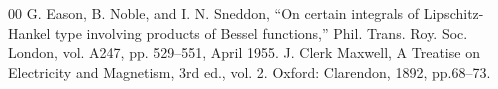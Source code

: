 \documentclass[conference]{IEEEtran}
\begin{document}


\begin{thebibliography}{00}
 G. Eason, B. Noble, and I. N. Sneddon, ``On certain integrals of Lipschitz-Hankel type involving products of Bessel functions,'' Phil. Trans. Roy. Soc. London, vol. A247, pp. 529--551, April 1955.
 J. Clerk Maxwell, A Treatise on Electricity and Magnetism, 3rd ed., vol. 2. Oxford: Clarendon, 1892, pp.68--73.
\end{thebibliography}
\end{document}

